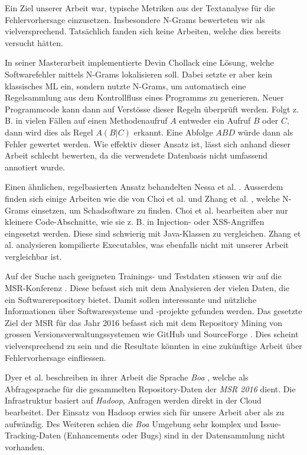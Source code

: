 \documentclass[10pt, a4paper]{article}
\begin{document}
Ein Ziel unserer Arbeit war, typische Metriken aus der Textanalyse für die Fehlervorhersage einzusetzen. Insbesondere N-Grams bewerteten wir als vielversprechend. Tatsächlich fanden sich keine Arbeiten, welche dies bereits versucht hätten.

In seiner Masterarbeit implementierte Devin Chollack \cite{chollak2015} eine Lösung, welche Softwarefehler mittels N-Grams lokalisieren soll. Dabei setzte er aber kein klassisches \ac{ML} ein, sondern nutzte N-Grams, um automatisch eine Regelsammlung aus dem Kontrollfluss eines Programms zu generieren. Neuer Programmcode kann dann auf Verstösse dieser Regeln überprüft werden. Folgt z. B. in vielen Fällen auf einen Methodenaufruf \(A\) entweder ein Aufruf \(B\) oder \(C\), dann wird dies als Regel \(A(B|C)\) erkannt. Eine Abfolge \(ABD\) würde dann als Fehler gewertet werden. Wie effektiv dieser Ansatz ist, lässt sich anhand dieser Arbeit schlecht bewerten, da die verwendete Datenbasis nicht umfassend annotiert wurde.

Einen ähnlichen, regelbasierten Ansatz behandelten Nessa et al. \cite{Nessa}. Ausserdem finden sich einige Arbeiten wie die von Choi et al. \cite{Choi2011} und Zhang et al. \cite{Zhang2007}, welche N-Grams einsetzen, um Schadsoftware zu finden. Choi et al. bearbeiten aber nur kleinere Code-Abschnitte, wie sie z. B. in Injection- oder XSS-Angriffen eingesetzt werden. Diese sind schwierig mit Java-Klassen zu vergleichen. Zhang et al. analysieren kompilierte Executables, was ebenfalls nicht mit unserer Arbeit vergleichbar ist.

Auf der Suche nach geeigneten Trainings- und Testdaten stiessen wir auf die \ac{MSR}-Konferenz \cite{msr2016}. Diese befasst sich mit dem Analysieren der vielen Daten, die ein Softwarerepository bietet. Damit sollen interessante und nützliche Informationen über Softwaresysteme und -projekte gefunden werden. Das gesetzte Ziel der \ac{MSR} für das Jahr 2016 befasst sich mit dem Repository Mining von grossen Versionsverwaltungssystemen wie GitHub \cite{githubhomepage} und SourceForge \cite{sourceforgehomepage}. Dies scheint vielversprechend zu sein und die Resultate könnten in eine zukünftige Arbeit über Fehlervorhersage einfliessen.

Dyer et al. \cite{Dyer:2015:BUS:2852270.2803171} beschreiben in ihrer Arbeit die Sprache \emph{Boa} \cite{boahomepage}, welche als Abfragesprache für die gesammelten Repository-Daten der \emph{\ac{MSR} 2016} dient. Die Infrastruktur basiert auf \emph{Hadoop}, Anfragen werden direkt in der Cloud bearbeitet. Der Einsatz von Hadoop erwies sich für unsere Arbeit aber als zu aufwändig. Des Weiteren schien die \emph{Boa} Umgebung sehr komplex und Issue-Tracking-Daten (Enhancements oder Bugs) sind in der Datensammlung nicht vorhanden.
\end{document}
